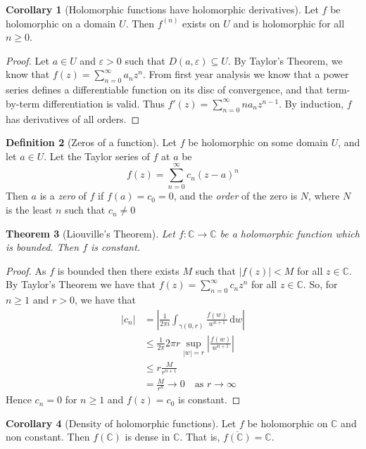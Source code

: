 \documentclass[10pt,fleqn]{article}
\newcommand{\diff}{\,\mathrm{d}}
\newcommand{\comps}{\mathbb{C}}
\newcommand{\eps}{\varepsilon}
\theoremstyle{definition} \newtheorem{defn}{Definition}[section]
\theoremstyle{plain}      \newtheorem{thm}[defn]{Theorem}
\theoremstyle{definition} \newtheorem{prop}[defn]{Proposition}
\theoremstyle{plain}      \newtheorem{lem}[defn]{Lemma}
\theoremstyle{definition} \newtheorem{cor}[defn]{Corollary}
\theoremstyle{definition} \newtheorem{ex}[defn]{Example}
\theoremstyle{definition} \newtheorem{rem}[defn]{Remark}
\begin{document}
\begin{cor}[Holomorphic functions have holomorphic derivatives]
    Let $f$ be holomorphic on a domain $U$.
    Then $f^{(n)}$ exists on $U$ and is holomorphic for all $n\geq0$.
\end{cor}

\begin{proof}
    Let $a\in U$ and $\eps>0$ such that $D(a,\eps)\subseteq U$.
    By Taylor's Theorem, we know that $f(z)=\sum_{n=0}^{\infty}a_nz^n$.
    From first year analysis we know that a power series defines a differentiable function on its disc of convergence, and that term-by-term differentiation is valid.
    Thus $f'(z)=\sum_{n=0}^{\infty}na_nz^{n-1}$.
    By induction, $f$ has derivatives of all orders.
\end{proof}

\begin{defn}[Zeros of a function]
    Let $f$ be holomorphic on some domain $U$, and let $a\in U$.
    Let the Taylor series of $f$ at $a$ be
    \[
        f(z)=
        \sum_{n=0}^{\infty}c_n(z-a)^n
    \]
    Then $a$ is a \emph{zero} of $f$ if $f(a)=c_0=0$, and the \emph{order} of the zero is $N$, where $N$ is the least $n$ such that $c_n\neq0$
\end{defn}

\begin{thm}[Liouville's Theorem]
    Let $f:\comps\to\comps$ be a holomorphic function which is bounded.
    Then $f$ is constant.
\end{thm}

\begin{proof}
    As $f$ is bounded then there exists $M$ such that $|f(z)|<M$ for all $z\in\comps$.
    By Taylor's Theorem we have that $f(z)=\sum_{n=0}^{\infty}c_nz^n$ for all $z\in\comps$.
    So, for $n\geq1$ and $r>0$, we have that
    \begin{align*}
        |c_n|
        &=
        \left|\frac{1}{2\pi i}\int_{\gamma(0,r)}\frac{f(w)}{w^{n+1}}\diff w\right|\\
        &\leq
        \frac{1}{2\pi}2\pi r\sup_{|w|=r}\left|\frac{f(w)}{w^{n+1}}\right|\\
        &\leq
        r\frac{M}{r^{n+1}}\\
        &=
        \frac{M}{r^n}\to0\quad\text{as }r\to\infty
    \end{align*}
    Hence $c_n=0$ for $n\geq1$ and $f(z)=c_0$ is constant.
\end{proof}

\begin{cor}[Density of holomorphic functions]
    Let $f$ be holomorphic on $\comps$ and non constant.
    Then $f(\comps)$ is dense in $\comps$.
    That is, $\overline{f(\comps)}=\comps$.
\end{cor}
\end{document}
